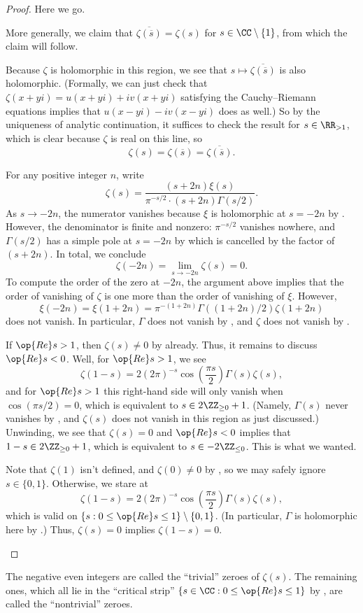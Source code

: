 \documentclass[../notes.tex]{subfiles}
\begin{document}
\begin{proof}
	Here we go.
	\begin{listalph}
		\item More generally, we claim that $\overline{\zeta(\overline s)}=\zeta(s)$ for $s\in\CC\setminus\{1\}$, from which the claim will follow.
		
		Because $\zeta$ is holomorphic in this region, we see that $s\mapsto\overline{\zeta(\overline s)}$ is also holomorphic. (Formally, we can just check that $\zeta(x+yi)=u(x+yi)+iv(x+yi)$ satisfying the Cauchy--Riemann equations implies that $u(x-yi)-iv(x-yi)$ does as well.) So by the uniqueness of analytic continuation, it suffices to check the result for $s\in\RR_{>1}$, which is clear because $\zeta$ is real on this line, so
		\[\zeta(s)=\zeta(\overline s)=\overline{\zeta(\overline s)}.\]

		\item For any positive integer $n$, write
		\[\zeta(s)=\frac{(s+2n)\xi(s)}{\pi^{-s/2}\cdot(s+2n)\Gamma(s/2)}.\]
		As $s\to-2n$, the numerator vanishes because $\xi$ is holomorphic at $s=-2n$ by . However, the denominator is finite and nonzero: $\pi^{-s/2}$ vanishes nowhere, and $\Gamma(s/2)$ has a simple pole at $s=-2n$ by  which is cancelled by the factor of $(s+2n)$. In total, we conclude
		\[\zeta(-2n)=\lim_{s\to-2n}\zeta(s)=0.\]
		To compute the order of the zero at $-2n$, the argument above implies that the order of vanishing of $\zeta$ is one more than the order of vanishing of $\xi$. However,
		\[\xi(-2n)=\xi(1+2n)=\pi^{-(1+2n)}\Gamma((1+2n)/2)\zeta(1+2n)\]
		does not vanish. In particular, $\Gamma$ does not vanish by , and $\zeta$ does not vanish by .

		\item If $\op{Re}s>1$, then $\zeta(s)\ne0$ by  already. Thus, it remains to discuss $\op{Re}s<0$. Well, for $\op{Re}s>1$, we see
		\[\zeta(1-s)=2(2\pi)^{-s}\cos\left(\frac{\pi s}2\right)\Gamma(s)\zeta(s),\]
		and for $\op{Re}s>1$ this right-hand side will only vanish when $\cos(\pi s/2)=0$, which is equivalent to $s\in2\ZZ_{\ge0}+1$. (Namely, $\Gamma(s)$ never vanishes by , and $\zeta(s)$ does not vanish in this region as just discussed.) Unwinding, we see that $\zeta(s)=0$ and $\op{Re}s<0$ implies that $1-s\in2\ZZ_{\ge0}+1$, which is equivalent to $s\in-2\ZZ_{\le0}$. This is what we wanted.

		\item Note that $\zeta(1)$ isn't defined, and $\zeta(0)\ne0$ by , so we may safely ignore $s\in\{0,1\}$. Otherwise, we stare at
		\[\zeta(1-s)=2(2\pi)^{-s}\cos\left(\frac{\pi s}2\right)\Gamma(s)\zeta(s),\]
		which is valid on $\{s:0\le\op{Re}s\le1\}\setminus\{0,1\}$. (In particular, $\Gamma$ is holomorphic here by .) Thus, $\zeta(s)=0$ implies $\zeta(1-s)=0$.
		\qedhere
	\end{listalph}
\end{proof}
\begin{remark}
	The negative even integers are called the ``trivial'' zeroes of $\zeta(s)$. The remaining ones, which all lie in the ``critical strip'' $\{s\in\CC:0\le\op{Re}s\le1\}$ by , are called the ``nontrivial'' zeroes.
\end{remark}
\end{document}
